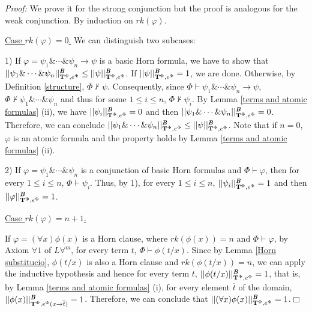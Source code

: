 \documentclass{IOS-Book-Article}
\newenvironment{proof}{ \noindent \textit{Proof:} }
{\hfill$\Box$\endtrivlist}
\begin{document}
\begin{proof} We prove it for the strong conjunction but the proof is analogous for the weak conjunction. By induction on $rk(\varphi)$. 



\bigskip

\underline{Case $rk(\varphi)=0$.} We can distinguish two subcases:  

\medskip


1) If $\varphi=\psi_1\&\dotsb\&\psi_n\rightarrow\psi$ is a basic Horn formula, we have to show that $||\psi_1\&\dotsb\&\psi_n||^{\emph{\textbf{B}}}_{\mathrm{\mathbf{T}}^{\Phi},e^{\Phi}}\leq|| \psi||^{\emph{\textbf{B}}}_{\mathrm{\mathbf{T}}^{\Phi},e^{\Phi}}$. If $|| \psi||^{\emph{\textbf{B}}}_{\mathrm{\mathbf{T}}^{\Phi},e^{\Phi}}=1$, we are done. Otherwise, by Definition \ref{structure}, $\Phi\not \vdash \psi$. Consequently, since $\Phi\vdash \psi_1\&\dotsb\&\psi_n\rightarrow\psi$, $\Phi\not \vdash \psi_1\&\dotsb\&\psi_n$ and thus for some $1 \leq i \leq n$, $\Phi\not \vdash \psi_i$. By Lemma \ref{terms and atomic formulas} (ii), we have $|| \psi_i||^{\emph{\textbf{B}}}_{\mathrm{\mathbf{T}}^{\Phi},e^{\Phi}}=0$ and then $||\psi_1\&\dotsb\&\psi_n||^{\emph{\textbf{B}}}_{\mathrm{\mathbf{T}}^{\Phi},e^{\Phi}}=0$. Therefore, we can conclude $||\psi_1\&\dotsb\&\psi_n||^{\emph{\textbf{B}}}_{\mathrm{\mathbf{T}}^{\Phi},e^{\Phi}}\leq|| \psi||^{\emph{\textbf{B}}}_{\mathrm{\mathbf{T}}^{\Phi},e^{\Phi}}$. Note that if $n=0$, $\varphi$ is an atomic formula and the property holds by Lemma \ref{terms and atomic formulas} (ii).

\smallskip

2) If $\varphi=\psi_1\&\dotsb\&\psi_n$ is a conjunction of basic Horn formulas and $\Phi\vdash\varphi$, then for every $1 \leq i \leq n$, $\Phi\vdash \psi_i$. Thus, by 1), for every $1 \leq i \leq n$, $||\psi_i||^{\emph{\textbf{B}}}_{\mathrm{\mathbf{T}}^{\Phi},e^{\Phi}}=1$ and then $|| \varphi||^{\emph{\textbf{B}}}_{\mathrm{\mathbf{T}}^{\Phi},e^{\Phi}}=1$.

\bigskip

\underline{Case $rk(\varphi)=n+1$.}

\medskip
 If $\varphi=(\forall x)\phi(x)$ is a Horn clause, where $rk(\phi(x))=n$ and $\Phi\vdash\varphi$, by Axiom \emph{$\forall 1$} of $L\forall^m$, for every term $t$, $\Phi\vdash\phi(t/x)$. Since by Lemma \ref{Horn substitucio}, $\phi(t/x)$ is also a Horn clause and $rk(\phi(t/x))=n$, we can apply the inductive hypothesis and hence for every term $t$, $||\phi(t/x)||^{\emph{\textbf{B}}}_{\mathrm{\mathbf{T}}^{\Phi},e^{\Phi}}=1$, that is, by Lemma \ref{terms and atomic formulas} (i), for every element $\overline{t}$ of the domain, $||\phi(x)||^{\emph{\textbf{B}}}_{\mathrm{\mathbf{T}}^{\Phi},e^{\Phi}(x\rightarrow\overline{t})}=1$. Therefore, we can conclude that $||(\forall x)\phi(x)||^{\emph{\textbf{B}}}_{\mathrm{\mathbf{T}}^{\Phi},e^{\Phi}}=1$.\end{proof}
 
\end{document}
